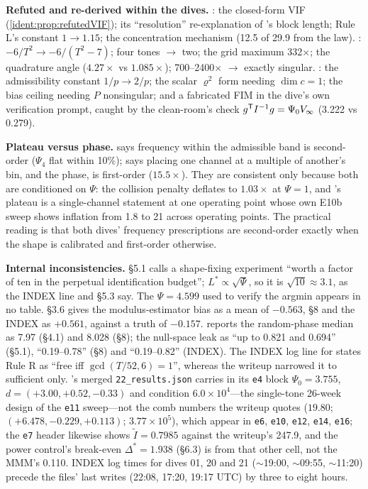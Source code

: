 \begin{reviewernote}
\textbf{Refuted and re-derived within the dives.} : the closed-form VIF (\cref{ident:prop:refutedVIF}); its ``resolution'' re-explanation of 's block length; Rule L's constant $1 \to 1.15$; the concentration mechanism (12.5 of 29.9 from the law). : $-6/T^2 \to -6/(T^2 - 7)$; four tones $\to$ two; the grid maximum 332$\times$; the quadrature angle ($4.27\times$ vs $1.085\times$); 700--2400$\times$ $\to$ exactly singular. : the admissibility constant $1/p \to 2/p$; the scalar $\varrho^2$ form needing $\dim c = 1$; the bias ceiling needing $P$ nonsingular; and a fabricated FIM in the dive's own verification prompt, caught by the clean-room's check $g^{\mathsf{T}} I^{-1}g = \Psi_0V_\infty$ (3.222 vs 0.279).

\textbf{Plateau versus phase.}  says frequency within the admissible band is second-order ($\Psi_4$ flat within 10\%);  says placing one channel at a multiple of another's bin, and the phase, is first-order ($15.5\times$). They are consistent only because both are conditioned on $\Psi$: the collision penalty deflates to $1.03\times$ at $\Psi = 1$, and 's plateau is a single-channel statement at one operating point whose own E10b sweep shows inflation from 1.8 to 21 across operating points. The practical reading is that both dives' frequency prescriptions are second-order exactly when the shape is calibrated and first-order otherwise.

\textbf{Internal inconsistencies.}  \S5.1 calls a shape-fixing experiment ``worth a factor of ten in the perpetual identification budget''; $L^* \propto \sqrt\Psi$, so it is $\sqrt{10} \approx 3.1$, as the INDEX line and \S5.3 say. The $\Psi = 4.599$ used to verify the argmin appears in no table.  \S3.6 gives the modulus-estimator bias as a mean of $-0.563$, \S8 and the INDEX as $+0.561$, against a truth of $-0.157$.  reports the random-phase median as 7.97 (\S4.1) and 8.028 (\S8); the null-space leak as ``up to 0.821 and 0.694'' (\S5.1), ``0.19--0.78'' (\S8) and ``0.19--0.82'' (INDEX). The INDEX log line for  states Rule R as ``free iff $\gcd(T/52, 6) = 1$'', whereas the writeup narrowed it to sufficient only. 's merged \texttt{22\_results.json} carries in its \texttt{e4} block $\Psi_0 = 3.755$, $d = (+3.00, +0.52, -0.33)$ and condition $6.0\times10^4$---the single-tone 26-week design of the \texttt{e11} sweep---not the comb numbers the writeup quotes ($19.80$; $(+6.478, -0.229, +0.113)$; $3.77\times10^5$), which appear in \texttt{e6}, \texttt{e10}, \texttt{e12}, \texttt{e14}, \texttt{e16}; the \texttt{e7} header likewise shows $\tilde I = 0.7985$ against the writeup's 247.9, and the power control's break-even $\Delta^* = 1.938$ (\S6.3) is from that other cell, not the MMM's 0.110. INDEX log times for dives 01, 20 and 21 ($\sim$19:00, $\sim$09:55, $\sim$11:20) precede the files' last writes (22:08, 17:20, 19:17 UTC) by three to eight hours.


\end{reviewernote}
